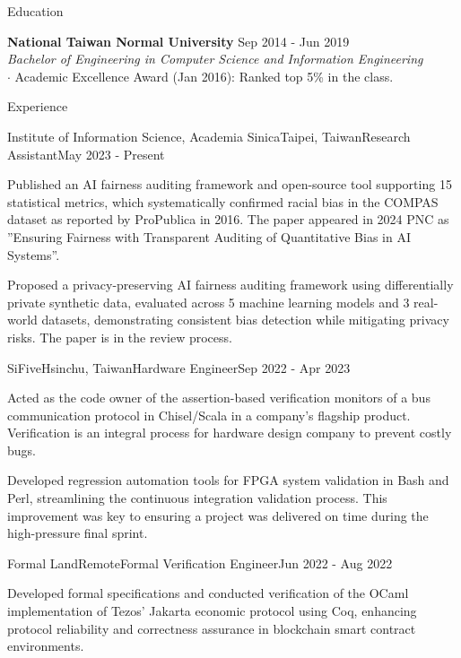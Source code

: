 \documentclass{resume} %
\begin{document}
\begin{rSection}{Education}

{\bf National Taiwan Normal University} \hfill {Sep 2014 - Jun 2019} \\
{\em Bachelor of Engineering in Computer Science and Information Engineering} \\
$\cdot$ Academic Excellence Award (Jan 2016): Ranked top 5\% in the class.

\end{rSection}

\begin{rSection}{Experience}

\begin{rSubsection}{Institute of Information Science, Academia Sinica}{Taipei, Taiwan}{Research Assistant}{May 2023 - Present}
\item Published an AI fairness auditing framework and open-source tool supporting 15 statistical metrics, which systematically confirmed racial bias in the COMPAS dataset as reported by ProPublica in 2016. The paper appeared in 2024 PNC as ''Ensuring Fairness with Transparent Auditing of Quantitative Bias in AI Systems''.
\item Proposed a privacy-preserving AI fairness auditing framework using differentially private synthetic data, evaluated across 5 machine learning models and 3 real-world datasets, demonstrating consistent bias detection while mitigating privacy risks. The paper is in the review process.
\end{rSubsection}

\begin{rSubsection}{SiFive}{Hsinchu, Taiwan}{Hardware Engineer}{Sep 2022 - Apr 2023}
\item Acted as the code owner of the assertion-based verification monitors of a bus communication protocol in Chisel/Scala in a company's flagship product. Verification is an integral process for hardware design company to prevent costly bugs.
\item Developed regression automation tools for FPGA system validation in Bash and Perl, streamlining the continuous integration validation process. This improvement was key to ensuring a project was delivered on time during the high-pressure final sprint.
\end{rSubsection}

\begin{rSubsection}{Formal Land}{Remote}{Formal Verification Engineer}{Jun 2022 - Aug 2022}
\item Developed formal specifications and conducted verification of the OCaml implementation of Tezos' Jakarta economic protocol using Coq, enhancing protocol reliability and correctness assurance in blockchain smart contract environments.
\end{rSubsection}


\end{rSection}
\end{document}
